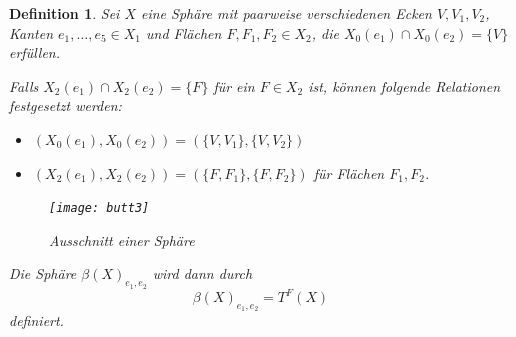 \documentclass[12pt,titlepage,twoside,cleardoublepage]{article}
\theoremstyle{nummermitklammern}
\newtheorem{definition}[temp]{Definition}
\newtheorem{definition}[zahl]{Definition}
\numberwithin{equation}{section}
\begin{document}
 \begin{definition}
 Sei $X$ eine Sphäre mit paarweise verschiedenen Ecken $V,V_1,V_2$, Kanten  $e_1,\ldots, e_5\in X_1$ und Flächen $F,F_1,F_2\in X_2$, die $ X_0(e_1)\cap X_0(e_2) =\{V\}$ erfüllen. 
 
 Falls $X_2(e_1)\cap X_2(e_2)=\{F\}$ für ein $F\in X_2$ ist, können folgende Relationen festgesetzt werden: 
\begin{itemize}
\item $(X_0(e_1),X_0(e_2))=(\{V,V_1\},\{V,V_2\})$
\item $(X_2(e_1),X_2(e_2))=(\{F,F_1\},\{F,F_2\})$ für Flächen $F_1,F_2$.
\end{itemize}
\begin{figure}[H]
\begin{center}
\texttt{[image: butt3]}
\end{center}
\caption{Ausschnitt einer Sphäre}
\end{figure}
Die Sphäre $\beta(X)_{e_1,e_2}$ wird dann durch
\[
\beta(X)_{e_1,e_2}= T^F(X)
\]
definiert.

\end{definition}
\end{document}
